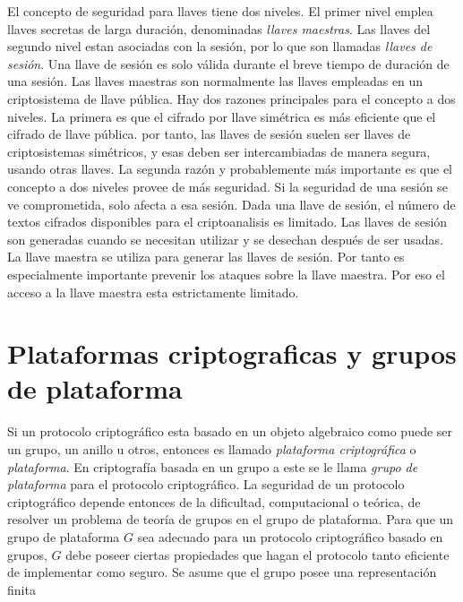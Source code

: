 \documentclass[12pt]{article}
\theoremstyle{definition}
\begin{document}
El concepto de seguridad para llaves tiene dos niveles. El primer nivel emplea llaves secretas de larga duración, denominadas \textit{llaves maestras}. Las llaves del segundo nivel estan asociadas con la sesión, por lo que son llamadas \textit{llaves de sesión}. Una llave de sesión es solo válida durante el breve tiempo de duración de una sesión. Las llaves maestras son normalmente las llaves empleadas en un criptosistema de llave pública.
\newline
\newline
Hay dos razones principales para el concepto a dos niveles. La primera es que el cifrado por llave simétrica es más eficiente que el cifrado de llave pública. por tanto, las llaves de sesión suelen ser llaves de criptosistemas simétricos, y esas deben ser intercambiadas de manera segura, usando otras llaves. La segunda razón y probablemente más importante es que el concepto a dos niveles provee de más seguridad. Si la seguridad de una sesión se ve comprometida, solo afecta a esa sesión. Dada una llave de sesión, el número de textos cifrados disponibles para el criptoanalisis es limitado. Las llaves de sesión son generadas cuando se necesitan utilizar y se desechan después de ser usadas.
\newline
\newline
La llave maestra se utiliza para generar las llaves de sesión. Por tanto es especialmente importante prevenir los ataques sobre la llave maestra. Por eso el acceso a la llave maestra esta estrictamente limitado.





















\section{Plataformas criptograficas y grupos de plataforma}

Si un protocolo criptográfico esta basado en un objeto algebraico como puede ser un grupo, un anillo u otros, entonces es llamado \textit{plataforma criptográfica} o \textit{plataforma}. En criptografía basada en un grupo a este se le llama \textit{grupo de plataforma} para el protocolo criptográfico. La seguridad de un protocolo criptográfico depende entonces de la dificultad, computacional o teórica, de resolver un problema de teoría de grupos en el grupo de plataforma.
\newline
\newline
Para que un grupo de plataforma $G$ sea adecuado para un protocolo criptográfico basado en grupos, $G$ debe poseer ciertas propiedades que hagan el protocolo tanto eficiente de implementar como seguro. Se asume que el grupo posee una representación finita
\end{document}
